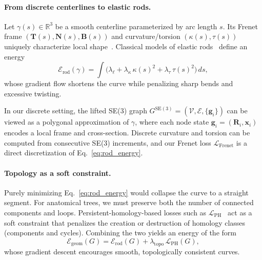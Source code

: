 \documentclass{article}
\newcommand{\SE}[1]{\mathrm{SE}(#1)}
\begin{document}
\paragraph{From discrete centerlines to elastic rods.}
Let $\gamma(s) \in \mathbb{R}^3$ be a smooth centerline parameterized by arc length $s$. Its Frenet frame $(\mathbf{T}(s),\mathbf{N}(s),\mathbf{B}(s))$ and curvature/torsion $(\kappa(s),\tau(s))$ uniquely characterize local shape~\cite{docarmo2016differential}. Classical models of elastic rods~\cite{bergou2008discrete} define an energy
\begin{equation}
  \mathcal{E}_{\text{rod}}(\gamma)
  = \int \big(\lambda_{\ell} 
     + \lambda_{\kappa}\,\kappa(s)^2 
     + \lambda_{\tau}\,\tau(s)^2 \big)\,ds,
  \label{eq:rod_energy}
\end{equation}
whose gradient flow shortens the curve while penalizing sharp bends and excessive twisting.

In our discrete setting, the lifted SE(3) graph $G^{\SE{3}} = (\mathcal{V},\mathcal{E},\{\mathbf{g}_i\})$ can be viewed as a polygonal approximation of $\gamma$, where each node state $\mathbf{g}_i = (\mathbf{R}_i,\mathbf{x}_i)$ encodes a local frame and cross-section. Discrete curvature and torsion can be computed from consecutive SE(3) increments, and our Frenet loss $\mathcal{L}_{\text{Frenet}}$ is a direct discretization of Eq.~\eqref{eq:rod_energy}.

\paragraph{Topology as a soft constraint.}
Purely minimizing Eq.~\eqref{eq:rod_energy} would collapse the curve to a straight segment. For anatomical trees, we must preserve both the number of connected components and loops. Persistent-homology-based losses such as $\mathcal{L}_{\text{PH}}$~\cite{clough2020topological,hu2021topoloss,anonymous_ijcai} act as a soft constraint that penalizes the creation or destruction of homology classes (components and cycles). Combining the two yields an energy of the form
\begin{equation}
  \mathcal{E}_{\text{geom}}(G) 
  = \mathcal{E}_{\text{rod}}(G)
  + \lambda_{\text{topo}} \,\mathcal{L}_{\text{PH}}(G),
\end{equation}
whose gradient descent encourages smooth, topologically consistent curves.
\end{document}
